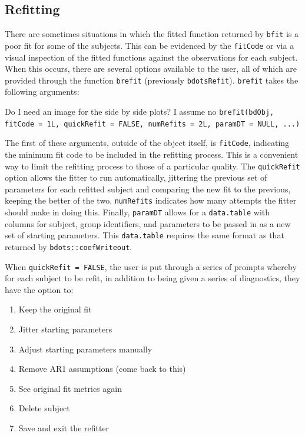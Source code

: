 \documentclass{article}
\begin{document}
\subsection{Refitting}

There are sometimes situations in which the fitted function returned by \texttt{bfit} is a poor fit for some of the subjects. This can be evidenced by the \texttt{fitCode} or via a visual inspection of the fitted functions against the observations for each subject.  When this occurs, there are several options available to the user, all of which are provided through the function \texttt{brefit} (previously \texttt{bdotsRefit}). \texttt{brefit} takes the following arguments:

\begin{center}
Do I need an image for the side by side plots? I assume no
\texttt{brefit(bdObj, fitCode = 1L, quickRefit = FALSE, numRefits = 2L, paramDT = NULL, ...)}
\end{center}

The first of these arguments, outside of the object itself, is \texttt{fitCode}, indicating  the minimum fit code to be included in the refitting process. This is a convenient way to limit the refitting process to those of a particular quality. The \texttt{quickRefit} option allows the fitter to run automatically, jittering the previous set of parameters for each refitted subject and comparing the new fit to the previous, keeping the better of the two. \texttt{numRefits} indicates how many attempts the fitter should make in doing this. Finally, \texttt{paramDT} allows for a \texttt{data.table} with columns for subject, group identifiers, and parameters to be passed in as a new set of starting parameters. This \texttt{data.table} requires the same format as that returned by \texttt{bdots::coefWriteout}.

When \texttt{quickRefit = FALSE}, the user is put through a series of prompts whereby for each subject to be refit, in addition to being given a series of diagnostics, they have the option to:

\begin{enumerate}
\item Keep the original fit
\item Jitter starting parameters
\item Adjust starting parameters manually
\item Remove AR1 assumptions (come back to this)
\item See original fit metrics again
\item Delete subject
\item Save and exit the refitter
\end{enumerate}
\end{document}
